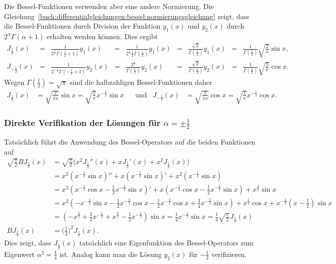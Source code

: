 Die Bessel-Funktionen verwenden aber eine andere Normierung. 
Die Gleichung~\eqref{buch:differentialgleichungen:bessel:normierungsgleichung}
zeigt, dass die Bessel-Funktionen durch Division
der Funktion $y_1(x)$ und $y_2(x)$ durch $2^\alpha \Gamma(\alpha+1)$ 
erhalten werden können.
Dies ergibt
\begin{equation*}
\renewcommand{\arraycolsep}{1pt}
\begin{array}{rclclclcl}
J_{\frac12}(x)
&=&
\displaystyle\frac{1}{2^{\frac12}\Gamma(\frac12+1)}
y_1(x)
&=&
\displaystyle\frac{1}{2^{\frac12}\frac12\Gamma(\frac12)}
y_1(x)
&=&
\displaystyle\frac{\sqrt{2}}{\Gamma(\frac12)}
y_1(x)
&=&
\displaystyle\frac{1}{\Gamma(\frac12)}
\sqrt{ \frac{2}{x}}
\sin x,
\\
J_{-\frac12}(x)
&=&
\displaystyle\frac{1}{2^{-\frac12}\Gamma(-\frac12+1)}
y_2(x)
&=&
\displaystyle\frac{2^{\frac12}}{\Gamma(\frac12)}
y_2(x)
&=&
\displaystyle\frac{\sqrt{2}}{\Gamma(\frac12)}
y_2(x)
&=&
\displaystyle\frac{1}{\Gamma(\frac12)}
\sqrt{\frac{2}{x}}
\cos x.
\end{array}
\end{equation*}
Wegen $\Gamma(\frac12)=\sqrt{\pi}$ sind die
halbzahligen Bessel-Funktionen daher
\begin{align*}
J_{\frac12}(x)
&=
\sqrt{\frac{2}{\pi x}} \sin x
=
\sqrt{\frac{2}{\pi}} x^{-\frac12}\sin x
&
&\text{und}&
J_{-\frac12}(x)
&=
\sqrt{\frac{2}{\pi x}} \cos x
=
\sqrt{\frac{2}{\pi}} x^{-\frac12}\cos x.
\end{align*}

%
%
\subsubsection{Direkte Verifikation der Lösungen für $\alpha=\pm\frac12$}
Tatsächlich führt die Anwendung des Bessel-Operators auf die beiden
Funktionen auf
\begin{align*}
\sqrt{\frac{\pi}2}
BJ_{\frac12}(x)
&=
\sqrt{\frac{\pi}2}
\biggl(
x^2J_{\frac12}''(x) + xJ_{\frac12}'(x) + x^2J_{\frac12}(x)
\biggr)
\\
&=
x^2(x^{-\frac12}\sin x)''
+
x(x^{-\frac12}\sin x)'
+
x^2(x^{-\frac12}\sin x)
\\
&=
x^2(
x^{-{\textstyle\frac12}}\cos x
-{\textstyle\frac12}x^{-\frac32}\sin x
)'
+
x(
x^{-\frac12}\cos x
-{\textstyle\frac12}x^{-\frac32}\sin x
)
+
x^{\frac32}\sin x
\\
&=
x^2(
-x^{-\frac12}\sin x
-{\textstyle\frac12}x^{-\frac32}\cos x
-{\textstyle\frac12}x^{-\frac32}\cos x
+{\textstyle\frac{3}{4}}x^{-\frac52}\sin x
)
+
x^{\frac12}\cos x
+
x^{-\frac12}(x-{\textstyle\frac12})\sin x
\\
&=
(
-x^{\frac32}
+{\textstyle\frac34}x^{-\frac12}
+x^{\frac32}
-{\textstyle\frac12}x^{-\frac12}
)
\sin x
=
\frac14x^{-\frac12}\sin x
=
\frac14
\sqrt{\frac{\pi}2}
J_{\frac12}(x)
\\
BJ_{\frac12}(x)
&=
\biggl(\frac12\biggr)^2 J_{\frac12}(x).
\end{align*}
Dies zeigt, dass $J_{\frac12}(x)$ tatsächlich eine Eigenfunktion
des Bessel-Operators zum Eigenwert $\alpha^2 = \frac14$ ist.
Analog kann man die Lösung $y_2(x)$ für $-\frac12$ verifizieren.

